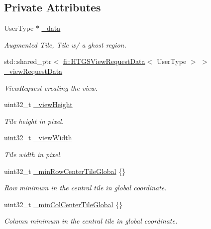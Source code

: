 \subsection*{Private Attributes}
\begin{DoxyCompactItemize}
\item 
User\+Type $\ast$ \hyperlink{classfi_1_1View_a96a3a09cea8cdc605c758d6bc63e989a}{\+\_\+data}
\begin{DoxyCompactList}\small\item\em Augmented Tile, Tile w/ a ghost region. \end{DoxyCompactList}\item 
std\+::shared\+\_\+ptr$<$ \hyperlink{classfi_1_1HTGSViewRequestData}{fi\+::\+H\+T\+G\+S\+View\+Request\+Data}$<$ User\+Type $>$ $>$ \hyperlink{classfi_1_1View_aea86565df8c8407afd3192d5a21a7821}{\+\_\+view\+Request\+Data}
\begin{DoxyCompactList}\small\item\em View\+Request creating the view. \end{DoxyCompactList}\item 
uint32\+\_\+t \hyperlink{classfi_1_1View_aafa2b86f9582cb59b60418b904abb5b2}{\+\_\+view\+Height}
\begin{DoxyCompactList}\small\item\em Tile height in pixel. \end{DoxyCompactList}\item 
uint32\+\_\+t \hyperlink{classfi_1_1View_a44c92ac3b13fbad8e0cc0ae0cca6efc8}{\+\_\+view\+Width}
\begin{DoxyCompactList}\small\item\em Tile width in pixel. \end{DoxyCompactList}\item 
uint32\+\_\+t \hyperlink{classfi_1_1View_a56cf8c8b40c17e7530f64bfbceb744df}{\+\_\+min\+Row\+Center\+Tile\+Global} \{\}
\begin{DoxyCompactList}\small\item\em Row minimum in the central tile in global coordinate. \end{DoxyCompactList}\item 
uint32\+\_\+t \hyperlink{classfi_1_1View_a711f41125a37607525f34f84f729d702}{\+\_\+min\+Col\+Center\+Tile\+Global} \{\}
\begin{DoxyCompactList}\small\item\em Column minimum in the central tile in global coordinate. \end{DoxyCompactList}\item 

\end{DoxyCompactItemize}

